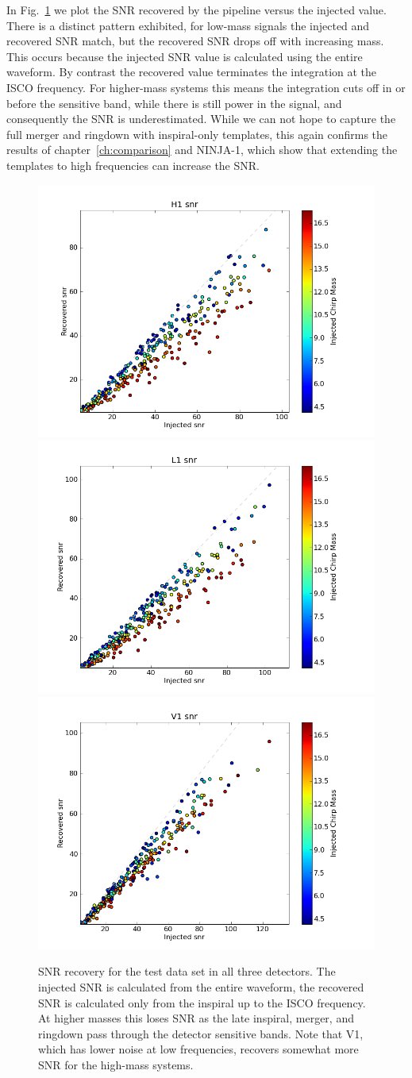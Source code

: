 In Fig.~\ref{f:test_recovered_snr} we plot the SNR recovered by the
pipeline versus the injected value.  There is a distinct pattern
exhibited, for low-mass signals the injected and recovered SNR match,
but the recovered SNR drops off with increasing mass.  This occurs
because the injected SNR value is calculated using the entire
waveform.  By contrast the recovered value terminates the integration
at the ISCO frequency.  For higher-mass systems this means the
integration cuts off in or before the sensitive band, while there is
still power in the signal, and consequently the SNR is underestimated.
While we can not hope to capture the full merger and ringdown with
inspiral-only templates, this again confirms the results of
chapter~\ref{ch:comparison} and NINJA-1, which show that extending the
templates to high frequencies can increase the SNR.

\begin{figure}
  \includegraphics[width=0.5\linewidth]{figures/ninja2_results/h1_snrs_second}
  \includegraphics[width=0.5\linewidth]{figures/ninja2_results/l1_snrs_second} \\
  \includegraphics[width=0.5\linewidth]{figures/ninja2_results/v1_snrs_second}
  \caption[SNR recovery for the test data set]{
  \label{f:test_recovered_snr}
SNR recovery for the test data set in all three detectors.  The
injected SNR is calculated from the entire waveform, the recovered SNR
is calculated only from the inspiral up to the ISCO frequency.  At
higher masses this loses SNR as the late inspiral, merger, and
ringdown pass through the detector sensitive bands.  Note that V1,
which has lower noise at low frequencies, recovers somewhat more SNR
for the high-mass systems.
}
\end{figure}%


